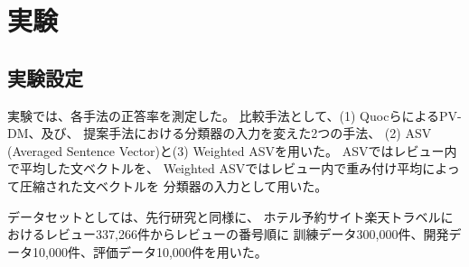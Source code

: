 \documentclass{ttisummary}
\begin{document}
\section{実験}

\subsection{実験設定}

実験では、各手法の正答率を測定した。
比較手法として、(1) Quocら\cite{quoc14}によるPV-DM、及び、
提案手法における分類器の入力を変えた2つの手法、
(2) ASV (Averaged Sentence Vector)と(3) Weighted ASVを用いた。
ASVではレビュー内で平均した文ベクトルを、
Weighted ASVではレビュー内で重み付け平均によって圧縮された文ベクトルを
分類器の入力として用いた。


データセットとしては、先行研究\cite{fujitani15}と同様に、
ホテル予約サイト楽天トラベルにおけるレビュー337,266件からレビューの番号順に
訓練データ300,000件、開発データ10,000件、評価データ10,000件を用いた。



\end{document}

